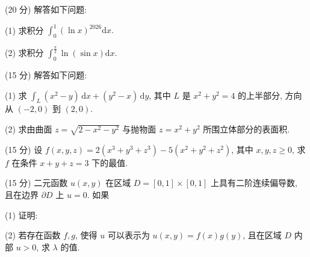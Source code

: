 (20 分) 解答如下问题:\par
(1) 求积分  $\int_{0}^{1}(\ln x)^{2026}\mathrm{d}x.$\par
(2) 求积分  $\int_{0}^{\frac{\pi}{2}}\ln(\sin x)\mathrm{d}x.$\par
(15 分) 解答如下问题:\par
(1) 求 $\int_{L} (x^{2} - y) \, \mathrm{d}x + (y^{2} - x) \, \mathrm{d}y$, 其中 $L$ 是 $x^{2} + y^{2} = 4$ 的上半部分, 方向从 $(-2,0)$ 到 $(2,0)$.\par
(2) 求由曲面 $z = \sqrt{2 - x^2 - y^2}$ 与抛物面 $z = x^2 + y^2$ 所围立体部分的表面积.\par
(15 分) 设 $f(x, y, z) = 2(x^3 + y^3 + z^3) - 5(x^2 + y^2 + z^2)$, 其中 $x, y, z \geq 0$, 求 $f$ 在条件 $x + y + z = 3$ 下的最值.\par
\par{}
(15 分) 二元函数 $u(x, y)$ 在区域 $D = [0, 1] \times [0, 1]$ 上具有二阶连续偏导数, 且在边界 $\partial D$ 上 $u = 0$. 如果\par
\nopagebreak[4]
(1) 证明: \par
(2) 若存在函数 $f, g$, 使得 $u$ 可以表示为 $u(x, y) = f(x)g(y)$, 且在区域 $D$ 内部 $u > 0$, 求 $\lambda$ 的值.\par
